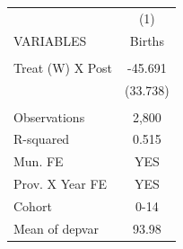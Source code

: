 \begin{tabular}{lc} \hline
 & (1) \\
VARIABLES & Births \\ \hline
 &  \\
Treat (W) X Post & -45.691 \\
 & (33.738) \\
 &  \\
Observations & 2,800 \\
R-squared & 0.515 \\
Mun. FE & YES \\
Prov. X Year FE & YES \\
Cohort & 0-14 \\
 Mean of depvar & 93.98 \\ \hline
\end{tabular}
